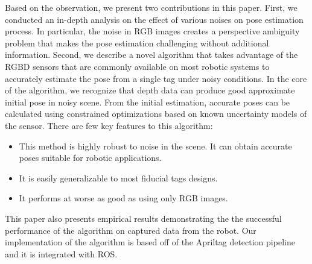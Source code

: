 Based on the observation, we present two contributions in this paper. First, we conducted an in-depth analysis on the effect of various noises on pose estimation process. In particular, the noise in RGB images creates a perspective ambiguity problem that makes the pose estimation challenging without additional information. Second, we describe a novel algorithm that takes advantage of the RGBD sensors that are commonly available on most robotic systems to accurately estimate the pose from a single tag under noisy conditions. In the core of the algorithm, we recognize that depth data can produce good approximate initial pose in noisy scene. From the initial estimation, accurate poses can be calculated using constrained optimizations based on known uncertainty models of the sensor. There are few key features to this algorithm: 
\begin{itemize}
\item This method is highly robust to noise in the scene. It can obtain accurate poses suitable for robotic applications.   
\item It is easily generalizable to most fiducial tags designs.
\item It performs at worse as good as using only RGB images.
\end{itemize}

This paper also presents empirical results demonstrating the the successful performance of the algorithm on captured data from the robot. Our implementation of the algorithm is based off of the Apriltag detection pipeline and it is integrated with ROS. 